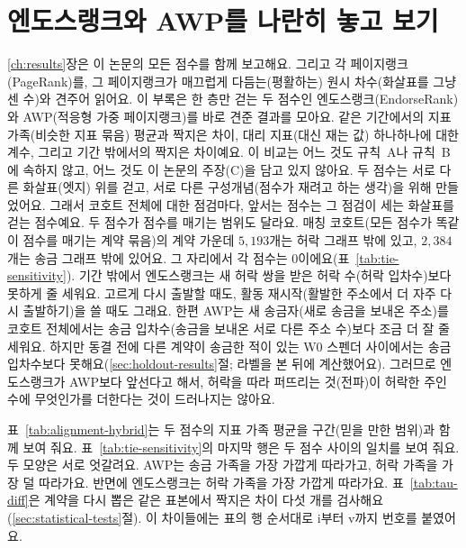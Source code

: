 \section{엔도스랭크와 AWP를 나란히 놓고 보기}
\label{ch:appendix-er-awp}

\ref{ch:results}장은 이 논문의 모든 점수를 함께 보고해요. 그리고 각 페이지랭크(PageRank)를, 그 페이지랭크가 매끄럽게 다듬는(평활하는) 원시 차수(화살표를 그냥 센 수)와 견주어 읽어요. 이 부록은 한 층만 걷는 두 점수인 엔도스랭크(EndorseRank)와 AWP(적응형 가중 페이지랭크)를 바로 견준 결과를 모아요. 같은 기간에서의 지표 가족(비슷한 지표 묶음) 평균과 짝지은 차이, 대리 지표(대신 재는 값) 하나하나에 대한 계수, 그리고 기간 밖에서의 짝지은 차이예요. 이 비교는 어느 것도 규칙~A나 규칙~B에 속하지 않고, 어느 것도 이 논문의 주장(C)을 담고 있지 않아요. 두 점수는 서로 다른 화살표(엣지) 위를 걷고, 서로 다른 구성개념(점수가 재려고 하는 생각)을 위해 만들었어요. 그래서 코호트 전체에 대한 점검마다, 앞서는 점수는 그 점검이 세는 화살표를 걷는 점수예요. 두 점수가 점수를 매기는 범위도 달라요. 매칭 코호트(모든 점수가 똑같이 점수를 매기는 계약 묶음)의 계약 가운데 $5{,}193$개는 허락 그래프 밖에 있고, $2{,}384$개는 송금 그래프 밖에 있어요. 그 자리에서 각 점수는 0이에요(표~\ref{tab:tie-sensitivity}). 기간 밖에서 엔도스랭크는 새 허락 쌍을 받은 허락 수(허락 입차수)보다 못하게 줄 세워요. 고르게 다시 출발할 때도, 활동 재시작(활발한 주소에서 더 자주 다시 출발하기)을 쓸 때도 그래요. 한편 AWP는 새 송금자(새로 송금을 보내온 주소)를 코호트 전체에서는 송금 입차수(송금을 보내온 서로 다른 주소 수)보다 조금 더 잘 줄 세워요. 하지만 동결 전에 다른 계약이 송금한 적이 있는 W0 스펜더 사이에서는 송금 입차수보다 못해요(\ref{sec:holdout-results}절; 라벨을 본 뒤에 계산했어요). 그러므로 엔도스랭크가 AWP보다 앞선다고 해서, 허락을 따라 퍼뜨리는 것(전파)이 허락한 주인 수에 무엇인가를 더한다는 것이 드러나지는 않아요.


표~\ref{tab:alignment-hybrid}는 두 점수의 지표 가족 평균을 구간(믿을 만한 범위)과 함께 보여 줘요. 표~\ref{tab:tie-sensitivity}의 마지막 행은 두 점수 사이의 일치를 보여 줘요. 두 모양은 서로 엇갈려요. AWP는 송금 가족을 가장 가깝게 따라가고, 허락 가족을 가장 덜 따라가요. 반면에 엔도스랭크는 허락 가족을 가장 가깝게 따라가요. 표~\ref{tab:tau-diff}은 계약을 다시 뽑은 같은 표본에서 짝지은 차이 다섯 개를 검사해요(\ref{sec:statistical-tests}절). 이 차이들에는 표의 행 순서대로 i부터 v까지 번호를 붙였어요.




